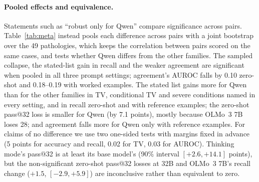 \documentclass[wcp]{jmlr}
\begin{document}
\begin{table}[t]
\begin{adjustbox}{max width=\linewidth}
\end{adjustbox}
\caption{Base $\rightarrow$ post-trained (final Instruct) differences on DDXPlus with 95\% intervals from a bootstrap over the 49 true-pathology clusters. $\dagger$: not significant after Holm correction across 112 tests (50,000 resamples, add-one p-values). The AUROCs here take the single-call answer from the first sample whose list names any of the 49 conditions, as in all headline tests; Table~\ref{tab:consequences} requires the top answer itself to be one of them, which changes the AUROC differences by at most 0.006.}
\label{tab:clustered}
\end{table}

\paragraph{Pooled effects and equivalence.} Statements such as ``robust only for Qwen'' compare significance across pairs. Table~\ref{tab:meta} instead pools each difference across pairs with a joint bootstrap over the 49 pathologies, which keeps the correlation between pairs scored on the same cases, and tests whether Qwen differs from the other families. The sampled collapse, the stated-list gain in recall and the weaker agreement are significant when pooled in all three prompt settings; agreement's AUROC falls by 0.10 zero-shot and 0.18--0.19 with worked examples. The stated list gains more for Qwen than for the other families in TV, conditional TV and severe conditions named in every setting, and in recall zero-shot and with reference examples; the zero-shot pass@32 loss is smaller for Qwen (by 7.1 points), mostly because OLMo~3 7B loses 28; and agreement falls more for Qwen only with reference examples. For claims of no difference we use two one-sided tests with margins fixed in advance (5 points for accuracy and recall, 0.02 for TV, 0.03 for AUROC). Thinking mode's pass@32 is at least its base model's (90\% interval $[+2.6,+14.1]$ points), but the non-significant zero-shot pass@32 losses at 32B and OLMo~3 7B's recall change ($+1.5$, $[-2.9,+5.9]$) are inconclusive rather than equivalent to zero.
\end{document}
